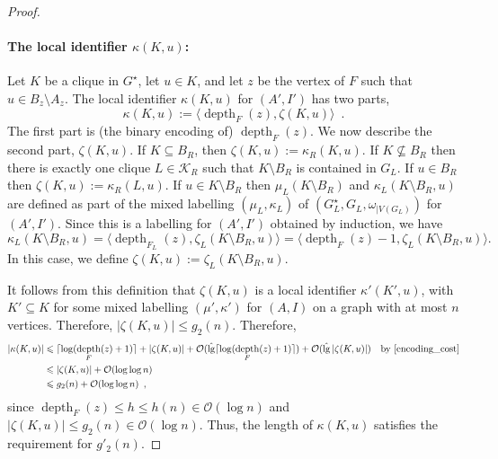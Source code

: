 \documentclass{patmorin}
\let\eqref\cref
\renewcommand{\le}{\leqslant}
\renewcommand{\leq}{\leqslant}
\DeclareMathOperator{\depth}{depth}
\DeclareMathOperator{\lgg}{\hat{lg}}
\newcommand{\Oh}{\calO}
\DeclarePairedDelimiter{\ceil}{\lceil}{\rceil}
\newcommand{\calK}{\mathcal{K}}
\newcommand{\calO}{\mathcal{O}}
\begin{document}
\begin{proof}
    \paragraph{\boldmath The local identifier $\kappa(K,u)$:}
    Let $K$ be a clique in $G^\star$, let $u\in K$, and let $z$ be the vertex of $F$ such that $u\in B_z\setminus A_z$.   The local identifier $\kappa(K,u)$ for $(A',I')$ has two parts,
    \[
        \kappa(K,u) := \langle\depth_F(z),\zeta(K,u)\rangle \enspace .
    \]
    The first part is (the binary encoding of) $\depth_F(z)$. We now describe the second part, $\zeta(K,u)$.  If $K\subseteq B_R$, then $\zeta(K,u):=\kappa_R(K,u)$.
    If $K\not\subseteq B_R$ then there is exactly one clique $L\in\calK_R$ such that $K\setminus B_R$ is contained in $G_L$.  If $u\in B_R$ then $\zeta(K,u):=\kappa_R(L,u)$.  If $u\in K\setminus B_R$ then $\mu_L(K\setminus B_R)$ and  $\kappa_L(K\setminus B_R, u)$ are defined as part of the mixed labelling $(\mu_L,\kappa_L)$ of $(G^\star_L,G_L,\omega_{|V(G_L)})$ for $(A',I')$.
    Since this is a labelling for $(A',I')$ obtained by induction, we have
    \begin{equation}
      \kappa_L(K\setminus B_R,u)=\langle\depth_{F_L}(z),\zeta_{L}(K\setminus B_R,u)\rangle=\langle\depth_F(z)-1,\zeta_L(K\setminus B_R,u)\rangle.
    \label{off_by_one}
    \end{equation}
    In this case, we define $\zeta(K,u):=\zeta_L(K\setminus B_R,u)$.

    It follows from this definition that $\zeta(K,u)$ is a local identifier $\kappa'(K',u)$, with $K'\subseteq K$ for some mixed labelling $(\mu',\kappa')$ for $(A,I)$ on a graph with at most $n$ vertices.  Therefore, $|\zeta(K,u)|\le g_2(n)$.  Therefore,
    \begin{align*}
      |\kappa(K,u)|
      & \le \ceil{\log(\depth_F(z)+1)} + |\zeta(K,u)|
      + \Oh(\lgg\ceil{\log(\depth_F(z)+1)}) + \Oh(\lgg|\zeta(K,u)|)
        & \text{by \eqref{encoding_cost}} \\
        &\leq |\zeta(K,u)| + \Oh(\log\log n)\\
        &\leq g_2(n) +  \Oh(\log\log n)\enspace,
    \end{align*}
    since $\depth_F(z)\le h\le h(n)\in \Oh(\log n)$ and $|\zeta(K,u)|\le g_2(n)\in\Oh(\log n)$.  Thus, the length of $\kappa(K,u)$ satisfies the requirement for $g'_2(n)$.


\end{proof}
\end{document}

